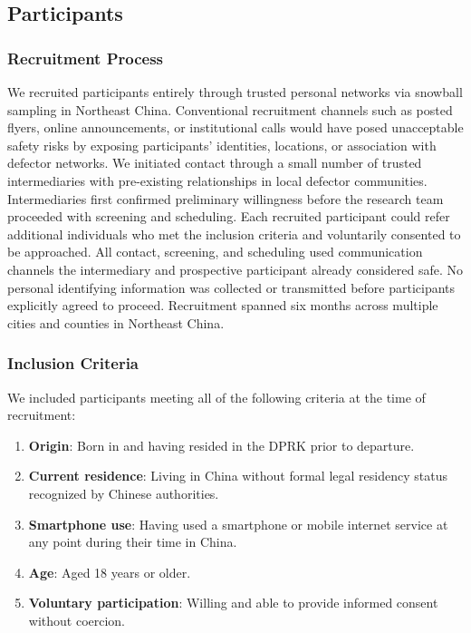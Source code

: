 \documentclass[conference,compsoc]{IEEEtran}
\begin{document}
\subsection{Participants}

\subsubsection{Recruitment Process}

We recruited participants entirely through trusted personal networks via snowball sampling in Northeast China. Conventional recruitment channels such as posted flyers, online announcements, or institutional calls would have posed unacceptable safety risks by exposing participants' identities, locations, or association with defector networks. We initiated contact through a small number of trusted intermediaries with pre-existing relationships in local defector communities. Intermediaries first confirmed preliminary willingness before the research team proceeded with screening and scheduling. Each recruited participant could refer additional individuals who met the inclusion criteria and voluntarily consented to be approached. All contact, screening, and scheduling used communication channels the intermediary and prospective participant already considered safe. No personal identifying information was collected or transmitted before participants explicitly agreed to proceed. Recruitment spanned six months across multiple cities and counties in Northeast China.

\subsubsection{Inclusion Criteria}

We included participants meeting all of the following criteria at the time of recruitment:

\begin{enumerate}[leftmargin=*, label=(\arabic*)]
  \item \textbf{Origin}: Born in and having resided in the DPRK prior to departure.
  \item \textbf{Current residence}: Living in China without formal legal residency status recognized by Chinese authorities.
  \item \textbf{Smartphone use}: Having used a smartphone or mobile internet service at any point during their time in China.
  \item \textbf{Age}: Aged 18 years or older.
  \item \textbf{Voluntary participation}: Willing and able to provide informed consent without coercion.
\end{enumerate}
\end{document}
